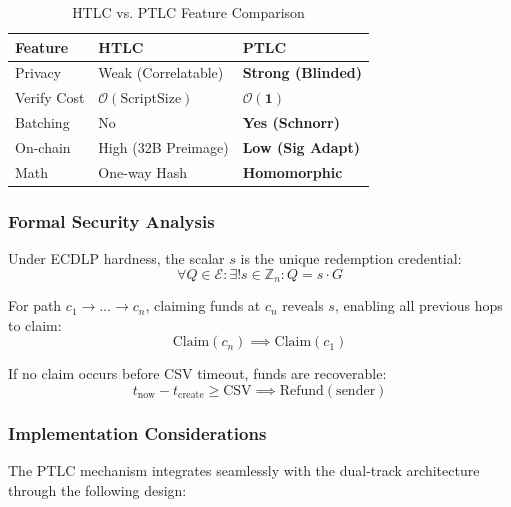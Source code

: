 \begin{table}[htbp]
\centering
\caption{HTLC vs. PTLC Feature Comparison}
\label{tab:htlc_ptlc}
\small
\begin{tabularx}{\linewidth}{@{}l X X@{}}
\toprule
\textbf{Feature} & \textbf{HTLC} & \textbf{PTLC} \\
\midrule
Privacy & Weak (Correlatable) & \textbf{Strong (Blinded)} \\
Verify Cost & $\mathcal{O}(\text{ScriptSize})$ & $\mathbf{\mathcal{O}(1)}$ \\
Batching & No & \textbf{Yes (Schnorr)} \\
On-chain & High (32B Preimage) & \textbf{Low (Sig Adapt)} \\
Math & One-way Hash & \textbf{Homomorphic} \\
\bottomrule
\end{tabularx}
\end{table}

\subsubsection{Formal Security Analysis}

\begin{theorem}
Under ECDLP hardness, the scalar $s$ is the unique redemption credential:
$$ \forall Q \in \mathcal{E}: \exists! s \in \mathbb{Z}_n: Q = s \cdot G $$
\end{theorem}

\begin{theorem}
For path $c_1 \to \dots \to c_n$, claiming funds at $c_n$ reveals $s$, enabling all previous hops to claim:
$$ \text{Claim}(c_n) \implies \text{Claim}(c_1) $$
\end{theorem}

\begin{theorem}
If no claim occurs before CSV timeout, funds are recoverable:
$$ t_{\mathrm{now}} - t_{\mathrm{create}} \ge \text{CSV} \implies \text{Refund}(\text{sender}) $$
\end{theorem}

\subsubsection{Implementation Considerations}

The PTLC mechanism integrates seamlessly with the dual-track architecture through the following design:

